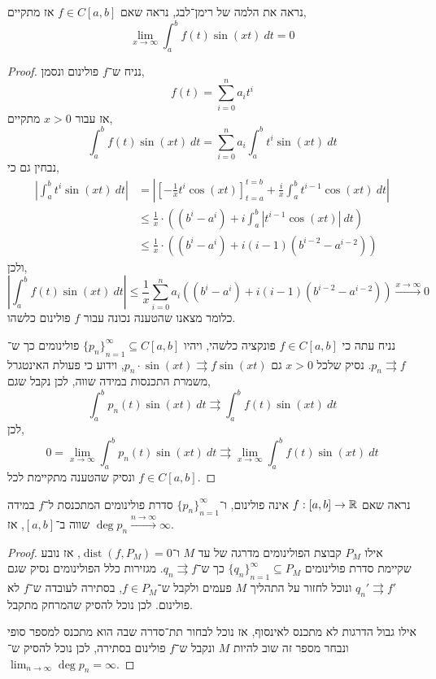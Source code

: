 \question{}
נראה את הלמה של רימן־לבג,
נראה שאם $f \in C[a, b]$ אז מתקיים,
\[
	\lim_{x \to \infty} \int_{a}^{b} f(t) \sin(xt)\ dt = 0
\]
\begin{proof}
	נניח ש־$f$ פולינום ונסמן,
	\[
		f(t)
		= \sum_{i = 0}^n a_i t^i
	\]
	אז עבור $x > 0$ מתקיים,
	\[
		\int_{a}^{b} f(t) \sin(xt)\ dt
		= \sum_{i = 0}^n a_i \int_{a}^{b} t^i \sin(xt)\ dt
	\]
	נבחין גם כי,
	\begin{align*}
		\left\lvert \int_{a}^{b} t^i \sin(xt)\ dt \right\rvert
		& = \left\lvert {\left[ -\frac{1}{x} t^i \cos(xt) \right]}_{t = a}^{t = b} + \frac{i}{x} \int_{a}^{b} t^{i - 1} \cos(xt)\ dt \right\rvert \\
		& \le \frac{1}{x} \cdot \left( (b^i - a^i) + i \int_{a}^{b} |t^{i - 1} \cos(xt)|\ dt \right) \\
		& \le \frac{1}{x} \cdot \left( (b^i - a^i) + i (i - 1) (b^{i - 2} - a^{i - 2}) \right)
	\end{align*}
	ולכן,
	\[
		\left\lvert \int_{a}^{b} f(t) \sin(xt)\ dt \right\rvert
		\le \frac{1}{x} \sum_{i = 0}^n a_i \left( (b^i - a^i) + i (i - 1) (b^{i - 2} - a^{i - 2}) \right)
		\xrightarrow{x \to \infty} 0
	\]
	כלומר מצאנו שהטענה נכונה עבור $f$ פולינום כלשהו.

	נניח עתה כי $f \in C[a, b]$ פונקציה כלשהי, ויהיו ${\{ p_n \}}_{n = 1}^\infty \subseteq C[a, b]$ פולינומים כך ש־$p_n \rightrightarrows f$.
	נסיק שלכל $x > 0$ גם $p_n \cdot \sin(xt) \rightrightarrows f \sin(xt)$, וידוע כי פעולת האינטגרל משמרת התכנסות במידה שווה, לכן נקבל שגם,
	\[
		\int_{a}^{b} p_n(t) \sin(xt)\ dt
		\rightrightarrows \int_{a}^{b} f(t) \sin(xt)\ dt
	\]
	לכן,
	\[
		0 = \lim_{x \to \infty} \int_{a}^{b} p_n(t) \sin(xt)\ dt
		\rightrightarrows \lim_{x \to \infty} \int_{a}^{b} f(t) \sin(xt)\ dt
	\]
	ונסיק שהטענה מתקיימת לכל $f \in C[a, b]$.
\end{proof}

\question{}
\subquestion{}
נראה שאם $f : [a, b] \to \mathbb{R}$ אינה פולינום, ו־${\{ p_n \}}_{n = 1}^\infty$ סדרת פולינומים המתכנסת ל־$f$ במידה שווה ב־$[a, b]$, אז $\deg p_n \xrightarrow{n \to \infty} \infty$.
\begin{proof}
	אילו $P_M$ קבוצת הפולינומים מדרגה של עד $M$ ו־$\operatorname{dist}(f, P_M) = 0$, אז נובע שקיימת סדרת פולינומים ${\{ q_n \}}_{n = 1}^\infty \subseteq P_M$ כך ש־$q_n \rightrightarrows f$.
	מגזירות כלל הפולינומים נסיק שגם $q_n' \rightrightarrows f'$ ונוכל לחזור על התהליך $M$ פעמים ולקבל ש־$f \in P_M$, בסתירה לעובדה ש־$f$ לא פולינום.
	לכן נוכל להסיק שהמרחק מתקבל.

	אילו גבול הדרגות לא מתכנס לאינסוף, אז נוכל לבחור תת־סדרה שבה הוא מתכנס למספר סופי ונבחר מספר זה שוב להיות $M$ ונקבל ש־$f$ פולינום בסתירה,
	לכן נוכל להסיק ש־$\lim_{n \to \infty} \deg p_n = \infty$.
\end{proof}

